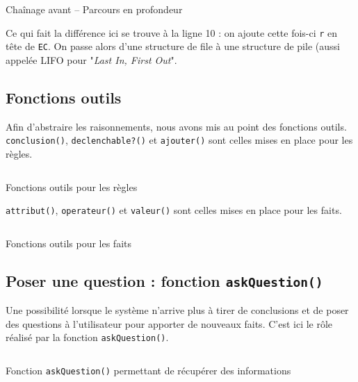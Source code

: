 \documentclass[a4paper,12pt]{article}
\begin{document}
\begin{listing}[H]
	\centering
	\inputminted[breaklines=true,linenos]{lisp}{../chainageAvantProf.lisp}
	\caption{Chaînage avant -- Parcours en profondeur}
\end{listing}


Ce qui fait la différence ici se trouve à la ligne 10 : on ajoute cette fois-ci \texttt{r} en tête de \texttt{EC}. On passe alors d'une structure de file à une structure de pile (aussi appelée LIFO pour "\textit{Last In, First Out}".

\newpage
\subsection{Fonctions outils}

Afin d'abstraire les raisonnements, nous avons mis au point des fonctions outils. \texttt{conclusion()}, \texttt{declenchable?()} et \texttt{ajouter()} sont celles mises en place pour les règles.
\begin{listing}[H]
	\centering
	\inputminted[breaklines=true,linenos]{lisp}{../fonctionsOutilsRegles.lisp}
	\caption{Fonctions outils pour les règles}
\end{listing}

\texttt{attribut()}, \texttt{operateur()} et \texttt{valeur()} sont celles mises en place pour les faits.

\begin{listing}[H]
	\centering
	\inputminted[breaklines=true,linenos]{lisp}{../fonctionsOutilsFaits.lisp}
	\caption{Fonctions outils pour les faits}
\end{listing}

\newpage
\subsection{Poser une question : fonction \texttt{askQuestion()}}

Une possibilité lorsque le système n'arrive plus à tirer de conclusions et de poser des questions à l'utilisateur pour apporter de nouveaux faits. C'est ici le rôle réalisé par la fonction \texttt{askQuestion()}.

\begin{listing}[H]
	\centering
	\inputminted[breaklines=true,linenos, lastline = 21]{lisp}{../askQuestion.lisp}
	\caption{Fonction \texttt{askQuestion()} permettant de récupérer des informations}
\end{listing}
\end{document}
